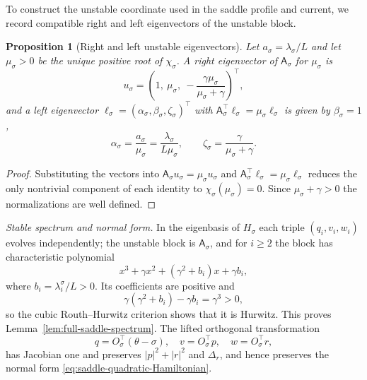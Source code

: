 \documentclass[11pt]{article}
\numberwithin{equation}{section}
\theoremstyle{plain}
\newtheorem{proposition}[theorem]{Proposition}
\theoremstyle{definition}
\theoremstyle{remark}
\begin{document}
To construct the unstable coordinate used in the saddle profile
and current, we record compatible right and left eigenvectors of the unstable
block.

\begin{proposition}[Right and left unstable eigenvectors]
\label{prop:saddle-eigenvectors}
Let $a_\sigma=\lambda_\sigma/L$ and let $\mu_\sigma>0$ be the unique positive
root of $\chi_\sigma$.  A right eigenvector of $\mathsf A_\sigma$ for
$\mu_\sigma$ is
\[
u_\sigma=\left(1,\ \mu_\sigma,\ -\frac{\gamma\mu_\sigma}{\mu_\sigma+\gamma}\right)^\top ,
\]
and a left eigenvector $\ell_\sigma=(\alpha_\sigma,\beta_\sigma,\zeta_\sigma)^\top$
with $\mathsf A_\sigma^\top\ell_\sigma=\mu_\sigma\ell_\sigma$ is given by
$\beta_\sigma=1$,
\[
\alpha_\sigma=\frac{a_\sigma}{\mu_\sigma}=\frac{\lambda_\sigma}{L\mu_\sigma},
\qquad
\zeta_\sigma=\frac{\gamma}{\mu_\sigma+\gamma}.
\]
\end{proposition}

\begin{proof}
Substituting the vectors into $\mathsf A_\sigma u_\sigma=\mu_\sigma u_\sigma$
and $\mathsf A_\sigma^\top\ell_\sigma=\mu_\sigma\ell_\sigma$ reduces the only
nontrivial component of each identity to $\chi_\sigma(\mu_\sigma)=0$.  Since
$\mu_\sigma+\gamma>0$ the normalizations are well defined.
\end{proof}

\emph{Stable spectrum and normal form.}  In the eigenbasis of $H_\sigma$ each
triple $(q_i,v_i,w_i)$ evolves independently; the unstable block is
$\mathsf A_\sigma$, and for $i\ge2$ the block has characteristic polynomial
\[
x^3+\gamma x^2+(\gamma^2+b_i)x+\gamma b_i,
\]
where
$b_i=\lambda_i^\sigma/L>0$.  Its coefficients are positive and
\[
\gamma(\gamma^2+b_i)-\gamma b_i=\gamma^3>0,
\]
so the cubic Routh--Hurwitz criterion
\cite[Chapter~XV, \S6]{Gantmacher1959} shows that it is Hurwitz.  This proves
Lemma~\ref{lem:full-saddle-spectrum}.  The lifted orthogonal transformation
\[
q=O_\sigma^\top(\theta-\sigma),
\quad v=O_\sigma^\top p,
\quad w=O_\sigma^\top r,
\]
has
Jacobian one and preserves $|p|^2+|r|^2$ and $\Delta_r$,
and hence preserves the normal form
\eqref{eq:saddle-quadratic-Hamiltonian}.
\end{document}
